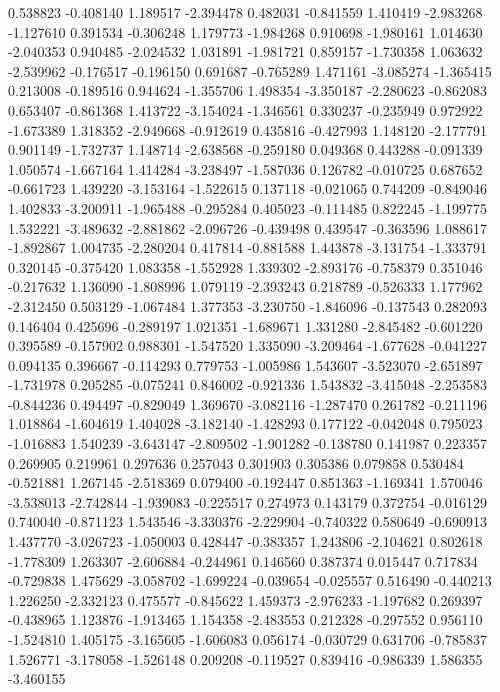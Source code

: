 0.538823
-0.408140
1.189517
-2.394478
0.482031
-0.841559
1.410419
-2.983268
-1.127610
0.391534
-0.306248
1.179773
-1.984268
0.910698
-1.980161
1.014630
-2.040353
0.940485
-2.024532
1.031891
-1.981721
0.859157
-1.730358
1.063632
-2.539962
-0.176517
-0.196150
0.691687
-0.765289
1.471161
-3.085274
-1.365415
0.213008
-0.189516
0.944624
-1.355706
1.498354
-3.350187
-2.280623
-0.862083
0.653407
-0.861368
1.413722
-3.154024
-1.346561
0.330237
-0.235949
0.972922
-1.673389
1.318352
-2.949668
-0.912619
0.435816
-0.427993
1.148120
-2.177791
0.901149
-1.732737
1.148714
-2.638568
-0.259180
0.049368
0.443288
-0.091339
1.050574
-1.667164
1.414284
-3.238497
-1.587036
0.126782
-0.010725
0.687652
-0.661723
1.439220
-3.153164
-1.522615
0.137118
-0.021065
0.744209
-0.849046
1.402833
-3.200911
-1.965488
-0.295284
0.405023
-0.111485
0.822245
-1.199775
1.532221
-3.489632
-2.881862
-2.096726
-0.439498
0.439547
-0.363596
1.088617
-1.892867
1.004735
-2.280204
0.417814
-0.881588
1.443878
-3.131754
-1.333791
0.320145
-0.375420
1.083358
-1.552928
1.339302
-2.893176
-0.758379
0.351046
-0.217632
1.136090
-1.808996
1.079119
-2.393243
0.218789
-0.526333
1.177962
-2.312450
0.503129
-1.067484
1.377353
-3.230750
-1.846096
-0.137543
0.282093
0.146404
0.425696
-0.289197
1.021351
-1.689671
1.331280
-2.845482
-0.601220
0.395589
-0.157902
0.988301
-1.547520
1.335090
-3.209464
-1.677628
-0.041227
0.094135
0.396667
-0.114293
0.779753
-1.005986
1.543607
-3.523070
-2.651897
-1.731978
0.205285
-0.075241
0.846002
-0.921336
1.543832
-3.415048
-2.253583
-0.844236
0.494497
-0.829049
1.369670
-3.082116
-1.287470
0.261782
-0.211196
1.018864
-1.604619
1.404028
-3.182140
-1.428293
0.177122
-0.042048
0.795023
-1.016883
1.540239
-3.643147
-2.809502
-1.901282
-0.138780
0.141987
0.223357
0.269905
0.219961
0.297636
0.257043
0.301903
0.305386
0.079858
0.530484
-0.521881
1.267145
-2.518369
0.079400
-0.192447
0.851363
-1.169341
1.570046
-3.538013
-2.742844
-1.939083
-0.225517
0.274973
0.143179
0.372754
-0.016129
0.740040
-0.871123
1.543546
-3.330376
-2.229904
-0.740322
0.580649
-0.690913
1.437770
-3.026723
-1.050003
0.428447
-0.383357
1.243806
-2.104621
0.802618
-1.778309
1.263307
-2.606884
-0.244961
0.146560
0.387374
0.015447
0.717834
-0.729838
1.475629
-3.058702
-1.699224
-0.039654
-0.025557
0.516490
-0.440213
1.226250
-2.332123
0.475577
-0.845622
1.459373
-2.976233
-1.197682
0.269397
-0.438965
1.123876
-1.913465
1.154358
-2.483553
0.212328
-0.297552
0.956110
-1.524810
1.405175
-3.165605
-1.606083
0.056174
-0.030729
0.631706
-0.785837
1.526771
-3.178058
-1.526148
0.209208
-0.119527
0.839416
-0.986339
1.586355
-3.460155
